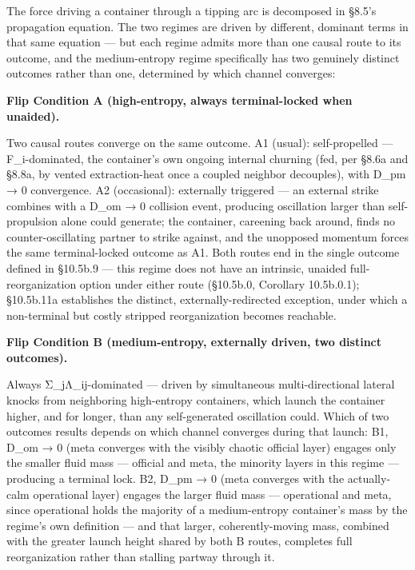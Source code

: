 \documentclass[
]{article}
\begin{document}
The force driving a container through a tipping arc is decomposed in
§8.5's propagation equation. The two regimes are driven by different,
dominant terms in that same equation --- but each regime admits more
than one causal route to its outcome, and the medium-entropy regime
specifically has two genuinely distinct outcomes rather than one,
determined by which channel converges:

\textbf{Flip Condition A (high-entropy, always terminal-locked when
unaided).}

Two causal routes converge on the same outcome. A1 (usual):
self-propelled --- F\_i-dominated, the container's own ongoing internal
churning (fed, per §8.6a and §8.8a, by vented extraction-heat once a
coupled neighbor decouples), with D\_pm → 0 convergence. A2
(occasional): externally triggered --- an external strike combines with
a D\_om → 0 collision event, producing oscillation larger than
self-propulsion alone could generate; the container, careening back
around, finds no counter-oscillating partner to strike against, and the
unopposed momentum forces the same terminal-locked outcome as A1. Both
routes end in the single outcome defined in §10.5b.9 --- this regime
does not have an intrinsic, unaided full-reorganization option under
either route (§10.5b.0, Corollary 10.5b.0.1); §10.5b.11a establishes the
distinct, externally-redirected exception, under which a non-terminal
but costly stripped reorganization becomes reachable.

\textbf{Flip Condition B (medium-entropy, externally driven, two
distinct outcomes).}

Always Σ\_jΛ\_ij-dominated --- driven by simultaneous multi-directional
lateral knocks from neighboring high-entropy containers, which launch
the container higher, and for longer, than any self-generated
oscillation could. Which of two outcomes results depends on which
channel converges during that launch: B1, D\_om → 0 (meta converges with
the visibly chaotic official layer) engages only the smaller fluid mass
--- official and meta, the minority layers in this regime --- producing
a terminal lock. B2, D\_pm → 0 (meta converges with the actually-calm
operational layer) engages the larger fluid mass --- operational and
meta, since operational holds the majority of a medium-entropy
container's mass by the regime's own definition --- and that larger,
coherently-moving mass, combined with the greater launch height shared
by both B routes, completes full reorganization rather than stalling
partway through it.
\end{document}
